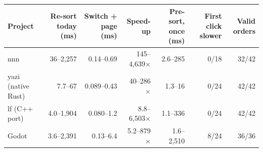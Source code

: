 \begin{tabular}{lrrrrrr}
\toprule
Project & Re-sort today (ms) & Switch + page (ms) & Speed-up & Pre-sort, once (ms) & First click slower & Valid orders\\
\midrule
nnn & 36--2{,}257 & 0.14--0.69 & 145--4{,}639$\times$ & 2.6--285 & 0/18 & 32/42\\
yazi (native Rust) & 7.7--67 & 0.089--0.43 & 40--286$\times$ & 1.3--16 & 0/24 & 42/42\\
lf (C++ port) & 4.0--1{,}904 & 0.080--1.2 & 8.8--6{,}503$\times$ & 1.1--336 & 0/24 & 42/42\\
Godot & 3.6--2{,}391 & 0.13--6.4 & 5.2--879$\times$ & 1.6--2{,}510 & 8/24 & 36/36\\
\bottomrule
\end{tabular}
